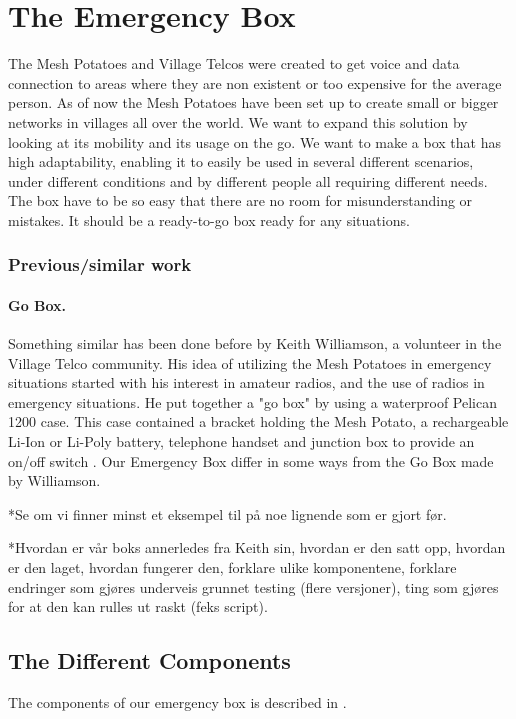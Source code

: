 \section{The Emergency Box}
The Mesh Potatoes and Village Telcos were created to get voice and data connection to areas where they are non existent or too expensive for the average person. As of now the Mesh Potatoes have been set up to create small or bigger networks in villages all over the world. We want to expand this solution by looking at its mobility and its usage on the go. We want to make a box that has high adaptability, enabling it to easily be used in several different scenarios, under different conditions and by different people all requiring different needs. The box have to be so easy that there are no room for misunderstanding or mistakes. It should be a ready-to-go box ready for any situations.  
 
\subsubsection{Previous/similar work}
\paragraph{Go Box.} Something similar has been done before by Keith Williamson, a volunteer in the Village Telco community. His idea of utilizing the Mesh Potatoes in emergency situations started with his interest in amateur radios, and the use of radios in emergency situations. He put together a "go box" by using a waterproof Pelican 1200 case. This case contained a bracket holding the Mesh Potato, a rechargeable Li-Ion or Li-Poly battery, telephone handset and junction box to provide an on/off switch \cite{keith}. Our Emergency Box differ in some ways from the Go Box made by Williamson. 

*Se om vi finner minst et eksempel til på noe lignende som er gjort før. 

*Hvordan er vår boks annerledes fra Keith sin, hvordan er den satt opp, hvordan er den laget, hvordan fungerer den, forklare ulike komponentene, forklare endringer som gjøres underveis grunnet testing (flere versjoner), ting som gjøres for at den kan rulles ut raskt (feks script). 

\subsection{The Different Components}
The components of our emergency box is described in . 

